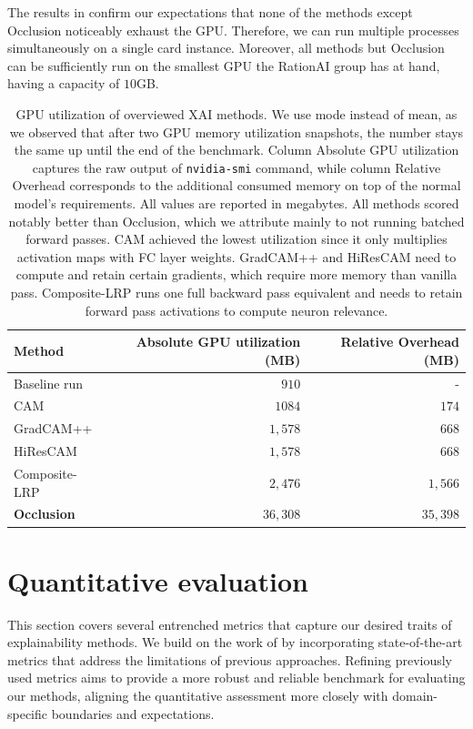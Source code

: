 The results in  confirm our expectations that none of the methods except Occlusion noticeably exhaust the GPU.
Therefore, we can run multiple processes simultaneously on a single card instance.
Moreover, all methods but Occlusion can be sufficiently run on the smallest GPU the RationAI group has at hand, having a capacity of $10$GB.
\begin{table}
\centering
{}
\begin{tabular}{@{} l r r @{}}\toprule
Method & Absolute GPU utilization (MB) & Relative Overhead (MB) \\ 
\midrule
Baseline run       & $910$      & -       \\
CAM                & $1084$     & $174$   \\
GradCAM++          & $1,578$     & $668$   \\
HiResCAM           & $1,578$     & $668$   \\
Composite-LRP      & $2,476$     & $1,566$  \\
\textbf{Occlusion} & $36,308$    & $35,398$ \\
\bottomrule
\end{tabular}
\caption{
GPU utilization of overviewed XAI methods. We use mode instead of mean, as we observed that after two GPU memory utilization snapshots, the number stays the same up until the end of the benchmark. Column Absolute GPU utilization captures the raw output of \texttt{nvidia-smi} command, while column Relative Overhead corresponds to the additional consumed memory on top of the normal model's requirements. All values are reported in megabytes. All methods scored notably better than Occlusion, which we attribute mainly to not running batched forward passes. CAM achieved the lowest utilization since it only multiplies activation maps with FC layer weights. GradCAM++ and HiResCAM need to compute and retain certain gradients, which require more memory than vanilla pass. Composite-LRP runs one full backward pass equivalent and needs to retain forward pass activations to compute neuron relevance.
}
\label{tab:gpu-util}
\end{table}


\section{Quantitative evaluation}\label{sec:quant}

This section covers several entrenched metrics that capture our desired traits of explainability methods.
We build on the work of \cite{gallo} by incorporating state-of-the-art metrics that address the limitations of previous approaches.
Refining previously used metrics aims to provide a more robust and reliable benchmark for evaluating our methods, aligning the quantitative assessment more closely with domain-specific boundaries and expectations.

